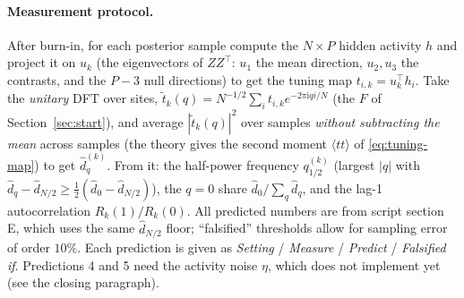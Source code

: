 \documentclass[11pt,a4paper]{article}
\theoremstyle{remark}
\begin{document}
\paragraph{Measurement protocol.} After burn-in, for each posterior sample compute the $N\times P$ hidden activity $h$ and project it on $u_k$ (the eigenvectors of $ZZ^\top$: $u_1$ the mean direction, $u_2, u_3$ the contrasts, and the $P-3$ null directions) to get the tuning map $t_{i,k} = u_k^\top h_i$. Take the \emph{unitary} DFT over sites, $\tilde t_k(q) = N^{-1/2}\sum_i t_{i,k}e^{-2\pi\mathrm iqi/N}$ (the $F$ of Section~\ref{sec:start}), and average $|\tilde t_k(q)|^2$ over samples \emph{without subtracting the mean} across samples (the theory gives the second moment $\langle tt\rangle$ of \eqref{eq:tuning-map}) to get $\hat d_q^{(k)}$. From it: the half-power frequency $q^{(k)}_{1/2}$ (largest $|q|$ with $\hat d_q - \hat d_{N/2}\ge\frac12(\hat d_0 - \hat d_{N/2})$), the $q = 0$ share $\hat d_0/\sum_q\hat d_q$, and the lag-1 autocorrelation $R_k(1)/R_k(0)$. All predicted numbers are from script section E, which uses the same $\hat d_{N/2}$ floor; ``falsified'' thresholds allow for sampling error of order $10\%$. Each prediction is given as \emph{Setting} / \emph{Measure} / \emph{Predict} / \emph{Falsified if}. Predictions 4 and 5 need the activity noise $\eta$, which  does not implement yet (see the closing paragraph).
\end{document}
